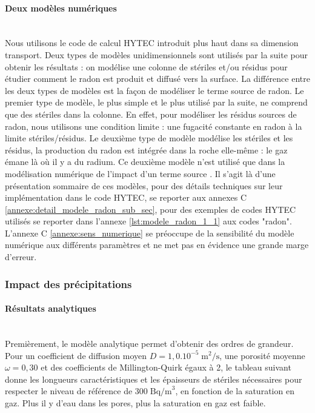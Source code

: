 \documentclass{article}
\begin{document}
\paragraph{Deux modèles numériques \\ \\}
Nous utilisons le code de calcul HYTEC introduit plus haut dans sa dimension transport. Deux types de modèles unidimensionnels sont utilisés par la suite pour obtenir les résultats : on modélise une colonne de stériles et/ou résidus pour étudier comment le radon est produit et diffusé vers la surface. La différence entre les deux types de modèles est la façon de modéliser le terme source de radon. Le premier type de modèle, le plus simple et le plus utilisé par la suite, ne comprend que des stériles dans la colonne. En effet, pour modéliser les résidus sources de radon, nous utilisons une condition limite : une fugacité constante en radon à la limite stériles/résidus. Le deuxième type de modèle modélise les stériles et les résidus, la production du radon est intégrée dans la roche elle-même : le gaz émane là où il y a du radium. Ce deuxième modèle n'est utilisé que dans la modélisation numérique de l'impact d'un terme source . Il s’agit là d’une présentation sommaire de ces modèles, pour des détails techniques sur leur implémentation dans le code HYTEC, se reporter aux annexes C \ref{annexe:detail_modele_radon_sub_sec}, pour des exemples de codes HYTEC utilisés se reporter dans l'annexe \ref{lst:modele_radon_1_1} aux codes "radon". L'annexe C \ref{annexe:sens_numerique} se préoccupe de la sensibilité du modèle numérique aux différents paramètres et ne met pas en évidence une grande marge d'erreur.

\subsubsection{Impact des précipitations}

\paragraph{Résultats analytiques \\ \\}
Premièrement, le modèle analytique permet d'obtenir des ordres de grandeur. Pour un coefficient de diffusion moyen $D=1,0.10^{-5} \; \text{m}^2/\text{s}$, une porosité moyenne $\omega=0,30$ et des coefficients de Millington-Quirk égaux à 2, le tableau suivant donne les longueurs caractéristiques et les épaisseurs de stériles nécessaires pour respecter le niveau de référence de $300\; \text{Bq/m}^3$, en fonction de la saturation en gaz. Plus il y d’eau dans les pores, plus la saturation en gaz est faible.
\end{document}
